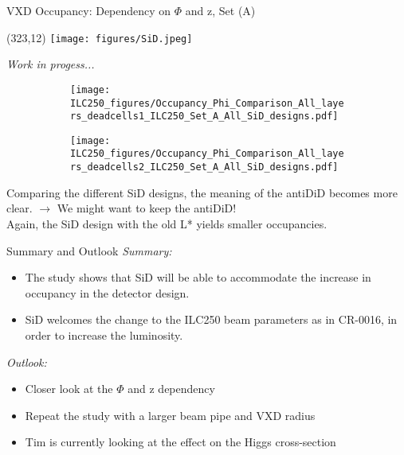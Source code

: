 \documentclass[xcolor={dvipsnames}]{beamer}
\newcommand{\sidlogo}{
  \setlength{\TPHorizModule}{1pt}
  \setlength{\TPVertModule}{1pt}
  \begin{textblock}{1}(323,12)
   \texttt{[image: figures/SiD.jpeg]}
  \end{textblock}
  }
\begin{document}
\begin{frame}{VXD Occupancy: Dependency on $\Phi$ and z, Set (A)}
\sidlogo
\flushright \textit{\small Work in progess...}
\begin{figure}
\centering
\begin{subfigure}[t]{0.48\textwidth}
\centering
\texttt{[image: ILC250\_figures/Occupancy\_Phi\_Comparison\_All\_layers\_deadcells1\_ILC250\_Set\_A\_All\_SiD\_designs.pdf]}
 \end{subfigure}
\hspace*{0.2cm}
\begin{subfigure}[t]{0.48\textwidth}
\centering
\texttt{[image: ILC250\_figures/Occupancy\_Phi\_Comparison\_All\_layers\_deadcells2\_ILC250\_Set\_A\_All\_SiD\_designs.pdf]}
\end{subfigure}
\end{figure}
\flushleft Comparing the different SiD designs, the meaning of the antiDiD becomes more clear. $\rightarrow$ We might want to keep the antiDiD!\\
Again, the SiD design with the old L* yields smaller occupancies.
\end{frame}

\begin{frame}{Summary and Outlook}
 \textit{Summary:}
 \begin{itemize}
  \item The study shows that SiD will be able to accommodate the increase in occupancy in the detector design.
  \item \alert{SiD welcomes the change to the ILC250 beam parameters as in CR-0016, in order to increase the luminosity.}
 \end{itemize}
 \vspace*{0.5cm}
 \textit{Outlook:}
  \begin{itemize}
   \item Closer look at the $\Phi$ and z dependency
   \item Repeat the study with a larger beam pipe and VXD radius
   \vspace*{0.2cm}
   \item Tim is currently looking at the effect on the Higgs cross-section
  \end{itemize}

\end{frame}



\end{document}
